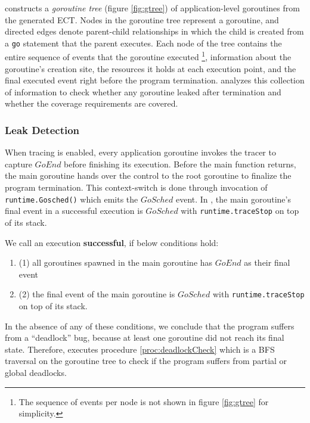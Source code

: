 \goat constructs a \textit{goroutine tree} (figure \ref{fig:gtree}) of application-level goroutines from the generated ECT.
%
Nodes in the goroutine tree represent a goroutine, and directed edges denote parent-child relationships in which the child is created from a \texttt{go} statement that the parent executes.
%
Each node of the tree contains the entire sequence of events that the goroutine executed \footnote{The sequence of events per node is not shown in figure \ref{fig:gtree} for simplicity.}, information about the goroutine's creation site, the resources it holds at each execution point, and the final executed event right before the program termination.
%
\goat analyzes this collection of information to check whether any goroutine leaked after termination and whether the coverage requirements are covered.

\subsubsection{Leak Detection}
When tracing is enabled, every application goroutine invokes the tracer to capture $GoEnd$ before finishing its execution.
%
Before the main function returns, the main goroutine hands over the control to the root goroutine to finalize the program termination.
%
This context-switch is done through invocation of \texttt{runtime.Gosched()} which emits the $GoSched$ event.
%
In \goat, the main goroutine's final event in a successful execution is $GoSched$ with \texttt{runtime.traceStop} on top of its stack.

We call an execution \textbf{successful}, if below conditions hold:
\begin{enumerate}
  \item (1) all goroutines spawned in the main goroutine has $GoEnd$ as their final event
  \item (2) the final event of the main goroutine is $GoSched$ with \texttt{runtime.traceStop} on top of its stack.
\end{enumerate}

In the absence of any of these conditions, we conclude that the program suffers from a ``deadlock'' bug, because at least one goroutine did not reach its final state.
%
Therefore, \goat executes procedure \ref{proc:deadlockCheck} which is a BFS traversal on the goroutine tree to check if the program suffers from partial or global deadlocks.


